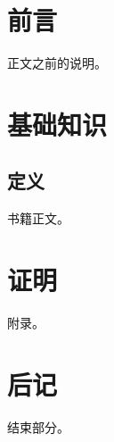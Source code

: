 \documentclass[UTF8,fontset=fandol,zihao=-4,oneside]{ctexbook}
\begin{document}
\frontmatter\tableofcontents\chapter{前言}正文之前的说明。
\mainmatter\chapter{基础知识}\section{定义}书籍正文。
\appendix\chapter{证明}附录。
\backmatter\chapter{后记}结束部分。
\end{document}
